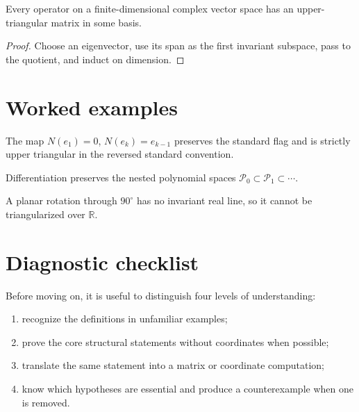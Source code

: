 \begin{theorem}\label{thm:i10-02}
Every operator on a finite-dimensional complex vector space has an upper-triangular matrix in some basis.
\begin{proof}
Choose an eigenvector, use its span as the first invariant subspace, pass to the quotient, and induct on dimension.
\end{proof}
\end{theorem}

\section{Worked examples}

\begin{example}\label{ex:i10-worked-01}
The map $N(e_1)=0$, $N(e_k)=e_{k-1}$ preserves the standard flag and is strictly upper triangular in the reversed standard convention.
\end{example}

\begin{example}\label{ex:i10-worked-02}
Differentiation preserves the nested polynomial spaces $\mathcal P_0\subset\mathcal P_1\subset\cdots$.
\end{example}

\begin{example}\label{ex:i10-worked-03}
A planar rotation through $90^\circ$ has no invariant real line, so it cannot be triangularized over $\mathbb R$.
\end{example}

\section{Diagnostic checklist}
Before moving on, it is useful to distinguish four levels of understanding:
\begin{enumerate}
\item recognize the definitions in unfamiliar examples;
\item prove the core structural statements without coordinates when possible;
\item translate the same statement into a matrix or coordinate computation;
\item know which hypotheses are essential and produce a counterexample when one is removed.
\end{enumerate}

